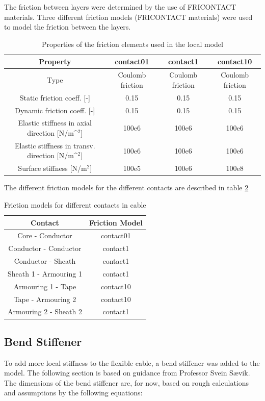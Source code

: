 \noindent The friction between layers were determined by the use of FRICONTACT materials. Three different friction models (FRICONTACT materials) were used to model the friction between the layers. 

\begin{table} [H]
\centering
\begin{tabular}{ |c|c|c|c|}
\hline
Property &contact01 & contact1  & contact10 \\
 \hline
 \hline
Type & Coulomb friction & Coulomb friction & Coulomb friction\\
Static friction coeff. [-] & 0.15 & 0.15 & 0.15\\
Dynamic friction coeff. [-] & 0.15 & 0.15 & 0.15\\
Elastic stiffness in axial direction [N/m^$^2$] & 100e6 & 100e6 & 100e6 \\
Elastic stiffness in transv. direction [N/m^$^2$]& 100e6 & 100e6 & 100e6 \\
Surface stiffness [N/m$^2$] & 100e5 & 100e6 & 100e8\\
 \hline
\end{tabular}
\caption{Properties of the friction elements used in the local model}
\label{table:friprop}
\end{table}

The different friction models for the different contacts are described in table \ref{table:frimod}

\begin{table} [H]
\centering
\begin{tabular}{ |c|c|}
\hline
Contact & Friction Model  \\
 \hline
 \hline
Core - Conductor & contact01\\
Conductor - Conductor & contact1\\
Conductor - Sheath & contact1\\
Sheath 1 - Armouring 1 & contact1\\
Armouring 1 - Tape &contact10\\
Tape - Armouring 2 &contact10\\
Armouring 2 - Sheath 2 & contact1\\
 \hline
\end{tabular}
\caption{Friction models for different contacts in cable}
\label{table:frimod}
\end{table}

\subsection{Bend Stiffener}
To add more local stiffness to the flexible cable, a bend stiffener was added to the model. The following section is based on guidance from Professor Svein Sævik. 
\newline 
\newline
The dimensions of the bend stiffener are, for now, based on rough calculations and assumptions by the following equations: \newline
\newline

